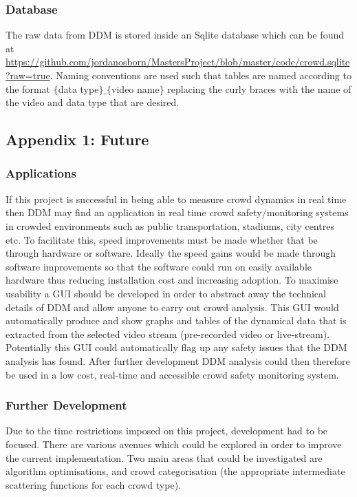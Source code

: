 \documentclass[10pt]{article}
\begin{document}
\subsubsection{Database}
\label{section:database}
The raw data from DDM is stored inside an Sqlite database which can be found at \url{https://github.com/jordanosborn/MastersProject/blob/master/code/crowd.sqlite?raw=true}. Naming conventions are used such that tables are named according to the format $\{$data type$\}\_\{$video name$\}$ replacing the curly braces with the name of the video and data type that are desired.

\subsection{Appendix 1: Future}
\label{section:future}
\subsubsection{Applications}
If this project is successful in being able to measure crowd dynamics in real time then DDM may find an application in real time crowd safety/monitoring systems in crowded environments such as public transportation, stadiums, city centres etc. To facilitate this, speed improvements must be made whether that be through hardware or software. Ideally the speed gains would be made through software improvements so that the software could run on easily available hardware thus reducing installation cost and increasing adoption. To maximise usability a GUI should be developed in order to abstract away the technical details of DDM and allow anyone to carry out crowd analysis. This GUI would automatically produce and show graphs and tables of the dynamical data that is extracted from the selected video stream (pre-recorded video or live-stream). Potentially this GUI could automatically flag up any safety issues that the DDM analysis has found. After further development DDM analysis could then therefore be used in a low cost, real-time and accessible crowd safety monitoring system.

\subsubsection{Further Development}
Due to the time restrictions imposed on this project, development had to be focused. There are various avenues which could be explored in order to improve the current implementation. Two main areas that could be investigated are algorithm optimisations, and crowd categorisation (the appropriate intermediate scattering functions for each crowd type).
\end{document}

